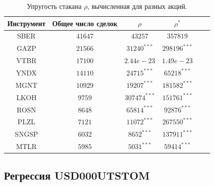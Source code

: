 \begin{table}[h!]
    \begin{center}
        \begin{tabular}{|c|c|c|c|c|c|}
            \hline
        Инструмент        & Общее число сделок & $\rho$ & $\rho ^*$ \\ \hline
        SBER &  $41647$  & $ 43257    $ & $ 357819     $ \\ \hline
        GAZP &  $21566$  & $ 31240^{***}    $ & $ 298196^{***}     $ \\ \hline
        VTBR &  $17100$  & $ 2.44e-23 $ & $ 1.49e-23 $  \\ \hline
        YNDX &  $14110$  & $ 24715^{***}    $ & $ 65218^{***}     $ \\ \hline
        MGNT &  $10929$  & $ 19207^{***}    $ & $ 181582^{***}    $  \\ \hline
        LKOH &  $9759 $ &  $307474^{***}    $ & $ 151761^{***}    $  \\ \hline
        ROSN &  $8648 $ &  $65814^{***}     $ & $ 92876^{***}     $ \\ \hline
        PLZL &  $7121 $ &  $11072^{***}     $ & $ 267550^{***}    $  \\ \hline
        SNGSP & $ 6032$  & $ 8652^{***}     $ & $ 137911^{***}    $  \\ \hline
        MTLR &  $5985 $ &  $5031^{***}      $ & $ 59414^{***}     $ \\ \hline
        \end{tabular}
    \end{center}
    \label{tableanal}
    \caption{Упругость стакана $\rho$, вычисленная для разных акций.}
\end{table} 

\subsection{Регрессия USD000UTSTOM}

